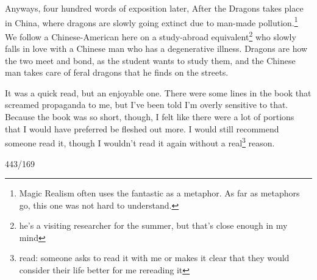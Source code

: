 \documentclass[12pt]{article}[titlepage]
\newcommand{\1}{\={a}}
\newcommand{\2}{\={e}}
\newcommand{\3}{\={\i}}
\newcommand{\4}{\=o}
\newcommand{\5}{\=u}
\newcommand{\6}{\={A}}
\renewcommand{\,}{\textsuperscript{,}}
\begin{document}
Anyways, four hundred words of exposition later, After the Dragons takes place in China, where dragons are slowly going extinct due to man-made pollution.\footnote{Magic Realism often uses the fantastic as a metaphor. As far as metaphors go, this one was not hard to understand.}
We follow a Chinese-American here on a study-abroad equivalent\footnote{he's a visiting researcher for the summer, but that's close enough in my mind} who slowly falls in love with a Chinese man who has a degenerative illness.
Dragons are how the two meet and bond, as the student wants to study them, and the Chinese man takes care of feral dragons that he finds on the streets.

It was a quick read, but an enjoyable one.
There were some lines in the book that screamed propaganda to me, but I've been told I'm overly sensitive to that.
Because the book was so short, though, I felt like there were a lot of portions that I would have preferred be fleshed out more.
I would still recommend someone read it, though I wouldn't read it again without a real\footnote{read: someone asks to read it with me or makes it clear that they would consider their life better for me rereading it} reason.

443/169
\end{document}
